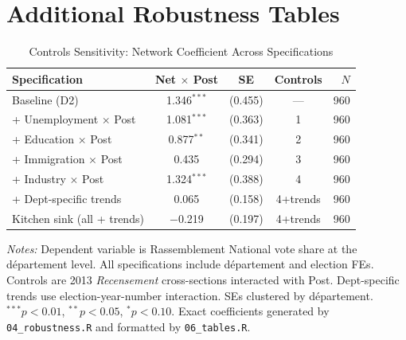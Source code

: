 \documentclass[12pt]{article}
\newcommand{\rn}{Rassemblement National}
\newcommand{\dept}{d\'{e}partement}
\begin{document}
\section{Additional Robustness Tables}
\label{app:robustness}

\begin{table}[H]
\centering
\caption{Controls Sensitivity: Network Coefficient Across Specifications}
\label{tab:controls}
\begin{threeparttable}
\begin{tabular}{@{}lcccr@{}}
\toprule
Specification & Net $\times$ Post & SE & Controls & $N$ \\
\midrule
Baseline (D2) & 1.346$^{***}$ & (0.455) & --- & 960 \\
+ Unemployment $\times$ Post & 1.081$^{***}$ & (0.363) & 1 & 960 \\
+ Education $\times$ Post & 0.877$^{**}$ & (0.341) & 2 & 960 \\
+ Immigration $\times$ Post & 0.435 & (0.294) & 3 & 960 \\
+ Industry $\times$ Post & 1.324$^{***}$ & (0.388) & 4 & 960 \\
+ Dept-specific trends & 0.065 & (0.158) & 4+trends & 960 \\
Kitchen sink (all + trends) & $-$0.219 & (0.197) & 4+trends & 960 \\
\bottomrule
\end{tabular}
\begin{tablenotes}
\small
\item \textit{Notes:} Dependent variable is \rn{} vote share at the \dept{} level. All specifications include \dept{} and election FEs. Controls are 2013 \textit{Recensement} cross-sections interacted with Post. Dept-specific trends use election-year-number interaction. SEs clustered by \dept{}. $^{***}p<0.01$, $^{**}p<0.05$, $^{*}p<0.10$. Exact coefficients generated by \texttt{04\_robustness.R} and formatted by \texttt{06\_tables.R}.
\end{tablenotes}
\end{threeparttable}
\end{table}
\end{document}
